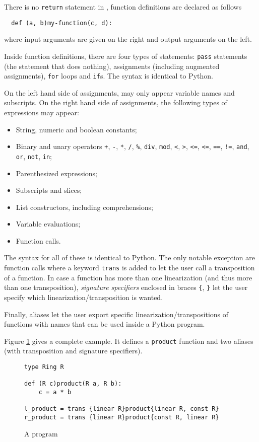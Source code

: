 There is no \lstinline+return+ statement in \tALpy{}, function
definitions are declared as follows
\begin{lstlisting}
  def (a, b)my-function(c, d):
\end{lstlisting}
where input arguments are given on the right and output arguments on
the left.

Inside function definitions, there are four types of statements:
\lstinline+pass+ statements (the statement that does nothing),
assignments (including augmented assignments), \lstinline+for+ loops
and \lstinline+if+s. The syntax is identical to Python.

On the left hand side of assignments, may only appear variable names
and subscripts. On the right hand side of assignments, the following
types of expressions may appear:
\begin{itemize}
\item String, numeric and boolean constants;
\item Binary and unary operators \lstinline-+-, \lstinline+-+,
  \lstinline+*+, \lstinline+/+,
  \lstinline+%+, \lstinline+div+, \lstinline+mod+, \lstinline+<+,
  \lstinline+>+, \lstinline+<=+, \lstinline+<=+, \lstinline+==+,
  \lstinline+!=+, \lstinline+and+, \lstinline+or+, \lstinline+not+,
  \lstinline+in+;
\item Parenthesized expressions;
\item Subscripts and slices;
\item List constructors, including comprehensions;
\item Variable evaluations;
\item Function calls.
\end{itemize}
The syntax for all of these is identical to Python. The only notable
exception are function calls where a keyword \lstinline+trans+ is
added to let the user call a transposition of a function. In case a
function has more than one linearization (and thus more than one
transposition), \emph{signature specifiers} enclosed in braces
\lstinline+{+, \lstinline+}+ let the user specify which
linearization/transposition is wanted.

Finally, aliases let the user export specific
linearization/transpositions of functions with names that can be used
inside a Python program.

Figure \ref{fig:prog} gives a complete \tALpy{} example. It defines a
\lstinline+product+ function and two aliases (with transposition and
signature specifiers).

\begin{figure}[!ht]
  \centering
\begin{lstlisting}
type Ring R

def (R c)product(R a, R b):
    c = a * b
  
l_product = trans {linear R}product{linear R, const R}
r_product = trans {linear R}product{const R, linear R}
\end{lstlisting}
  
  \caption{A \tALpy{} program}
  \label{fig:prog}
\end{figure}


